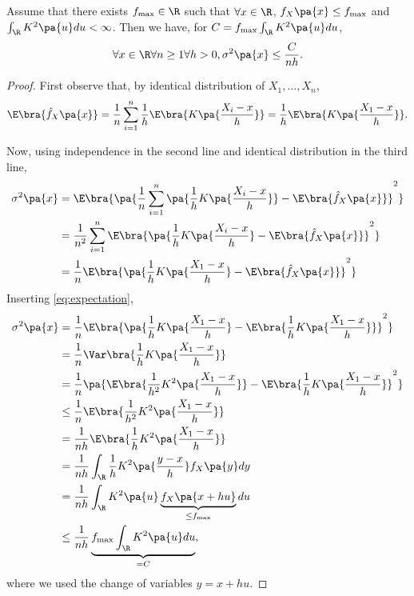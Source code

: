 \begin{proposition}\label{prop:1}
  Assume that there exists $f_{\max}\in \R$ such that $\forall x\in \R$, $f_X\pa{x}\leq f_{\max}$ and $\int_\R K^2\pa{u}du <\infty$. Then we have, for $C= f_{\max}\int_\R K^2\pa{u}du$,
  \begin{equation}
    \forall x\in\R\forall n\geq 1 \forall h>0, \sigma^2\pa{x}\leq \frac{C}{nh}.
  \end{equation}
\end{proposition}
\begin{proof}
  First observe that, by identical distribution of $X_1,\ldots, X_n$,
  \begin{equation}\label{eq:expectation}
    \E\bra{\hat{f}_X\pa{x}} = \frac{1}{n}\sum_{i=1}^n \frac{1}{h}\E\bra{K\pa{\frac{X_i-x}{h}}} = \frac{1}{h}\E\bra{K\pa{\frac{X_1-x}{h}}}.
  \end{equation}

  Now, using independence in the second line and identical distribution in the third line,
  \begin{equation}
  \begin{split}
    \sigma^2\pa{x} &= \E\bra{\pa{\frac{1}{n} \sum_{i=1}^n \pa{\frac{1}{h} K\pa{\frac{X_i-x}{h}}} - \E\bra{\hat{f}_X \pa{x}}}^2} \\
    &=\frac{1}{n^2} \sum_{i=1}^n\E\bra{ \pa{\frac{1}{h} K\pa{\frac{X_i-x}{h}} - \E\bra{\hat{f}_X \pa{x}}}^2}\\
    &= \frac{1}{n} \E\bra{\pa{ \frac{1}{h} K\pa{\frac{X_1-x}{h}}- \E\bra{\hat{f}_X \pa{x}}}^2}
      \end{split}
  \end{equation}
  Inserting \cref{eq:expectation},
  \begin{equation}
    \begin{split}
      \sigma^2\pa{x} &= \frac{1}{n} \E\bra{\pa{ \frac{1}{h} K\pa{\frac{X_1-x}{h}} - \E\bra{\frac{1}{h} K\pa{\frac{X_1-x}{h}}}}^2}\\
      &= \frac{1}{n}\Var\bra{\frac{1}{h} K\pa{\frac{X_1-x}{h}}} \\
      &= \frac{1}{n}\pa{ \E\bra{\frac{1}{h^2} K^2\pa{\frac{X_1-x}{h}} } - \E\bra{\frac{1}{h} K\pa{\frac{X_1-x}{h}}}^2} \\
      &\leq \frac{1}{n} \E\bra{\frac{1}{h^2} K^2\pa{\frac{X_1-x}{h}} }\\
      &=\frac{1}{nh} \E\bra{\frac{1}{h} K^2\pa{\frac{X_1-x}{h}} } \\
      &=\frac{1}{nh} \int_\R \frac{1}{h} K^2\pa{\frac{y-x}{h}} f_X\pa{y}dy\\
      &= \frac{1}{nh} \int_\R K^2\pa{u} \underbrace{f_X\pa{x+h u}}_{\leq f_{\max}} du \\
      &\leq \frac{1}{nh} \underbrace{f_{\max} \int_\R K^2\pa{u} du}_{=C},
    \end{split}
  \end{equation}
  where we used the change of variables $y=x+hu$.
\end{proof}

